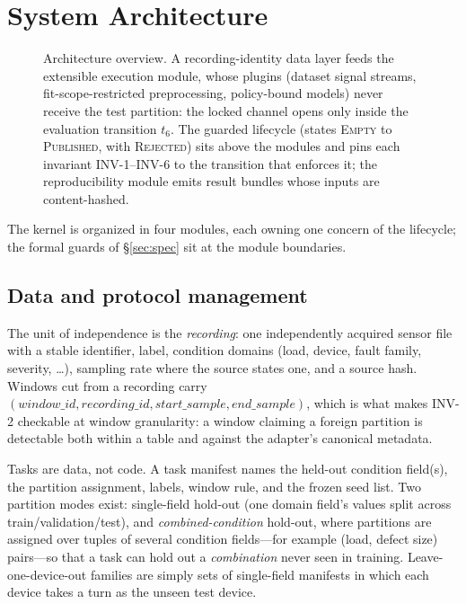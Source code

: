 \section{System Architecture}
\label{sec:arch}

\begin{figure}[t]
\centering
\caption{Architecture overview. A recording-identity data layer feeds the
extensible execution module, whose plugins (dataset signal streams,
fit-scope-restricted preprocessing, policy-bound models) never receive the
test partition: the locked channel opens only inside the evaluation
transition $t_6$. The guarded lifecycle (states \textsc{Empty} to
\textsc{Published}, with \textsc{Rejected}) sits above the modules and pins
each invariant INV-1--INV-6 to the transition that enforces it; the
reproducibility module emits result bundles whose inputs are content-hashed.}
\label{fig:overview}
\end{figure}

The kernel is organized in four modules, each owning one concern of the
lifecycle; the formal guards of \S\ref{sec:spec} sit at the module
boundaries.

\subsection{Data and protocol management}

The unit of independence is the \emph{recording}: one independently acquired
sensor file with a stable identifier, label, condition domains (load, device,
fault family, severity, \dots), sampling rate where the source states one,
and a source hash. Windows cut from a recording carry
$(\textit{window\_id}, \textit{recording\_id}, \textit{start\_sample},
\textit{end\_sample})$, which is what makes INV-2 checkable at window
granularity: a window claiming a foreign partition is detectable both within
a table and against the adapter's canonical metadata.

Tasks are data, not code. A task manifest names the held-out condition
field(s), the partition assignment, labels, window rule, and the frozen seed
list. Two partition modes exist: single-field hold-out (one domain field's
values split across train/validation/test), and \emph{combined-condition}
hold-out, where partitions are assigned over tuples of several condition
fields---for example (load, defect size) pairs---so that a task can hold out
a \emph{combination} never seen in training. Leave-one-device-out families
are simply sets of single-field manifests in which each device takes a turn
as the unseen test device.

